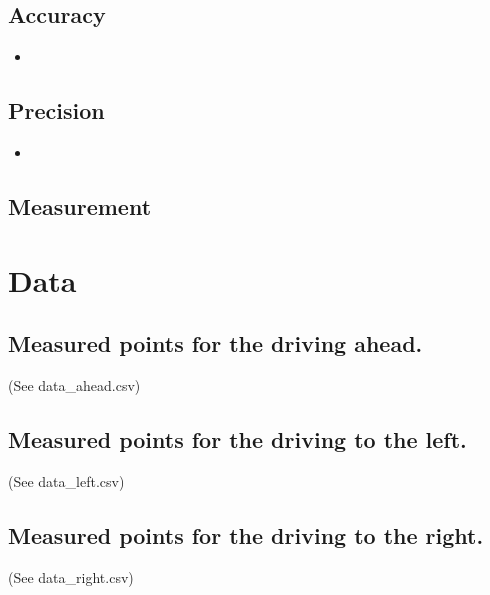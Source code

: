 \documentclass{scrartcl}
\begin{document}
\subsection{Accuracy}
\begin{itemize}
\item
\end{itemize}

\subsection{Precision}
\begin{itemize}
\item
\end{itemize}


\subsection{Measurement}


\section{Data}
\subsection{Measured points for the driving ahead.}
 (See data\_ahead.csv)\\


\subsection{Measured points for the driving to the left.}
 (See data\_left.csv)\\

\subsection{Measured points for the driving to the right.}
 (See data\_right.csv)\\
\end{document}
